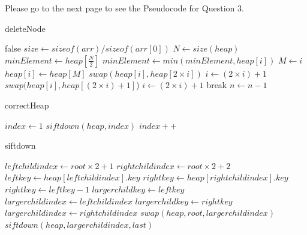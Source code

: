 \documentclass{article}
\begin{document}
Please go to the next page to see the Pseudocode for Question 3.

\begin{algorithm}
\caption{deleteNode}\label{alg:cap}
\begin{algorithmic}
\State \Return false
\Else
\State $size \gets sizeof(arr) / sizeof(arr[0])$
\State $N \gets size(heap)$
\State $minElement \gets heap[\frac{N}{2}]$
\State $minElement \gets min(minElement, heap[i])$
\EndFor
{}
\State $M \gets i$
\State $heap[i] \gets heap[M]$
\EndIf
\EndFor
{}
\State $swap(heap[i], heap[2 \times i])$
\State $i \gets (2 \times i)+1$
\State $swap(heap[i], heap[(2 \times i)+1]$)
\State $i \gets (2 \times i)+1$
\Else
\State break
\EndIf
\EndFor
\State $n \gets n-1$
\EndIf
\end{algorithmic}
\end{algorithm}

\begin{algorithm}
\caption{correctHeap}\label{alg:cap}
\begin{algorithmic}
\State $index \gets 1$
\State $siftdown(heap, index)$
\State $index++$
\EndWhile
\end{algorithmic}
\end{algorithm}

\begin{algorithm}
\caption{siftdown}\label{alg:cap}
\begin{algorithmic}
\State $leftchildindex \gets root \times 2+1$
\State $rightchildindex \gets root \times 2+2$
\State $leftkey \gets heap[leftchildindex].key$
\State $rightkey \gets heap[rightchildindex].key$
\Else
\State $rightkey \gets leftkey-1$
\EndIf
{}
\State $largerchildkey \gets leftkey$
\State $largerchildindex \gets leftchildindex$
\Else
\State $largerchildkey \gets rightkey$
\State $largerchildindex \gets rightchildindex$
\EndIf
{}
\State $swap(heap, root, largerchildindex)$
\State $siftdown(heap, largerchildindex, last)$
\EndIf
\EndIf
\end{algorithmic}
\end{algorithm}
\end{document}
